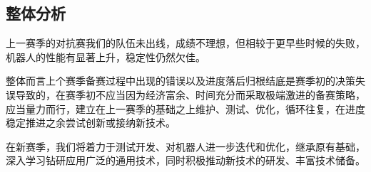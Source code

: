 \subsection{整体分析}

    上一赛季的对抗赛我们的队伍未出线，成绩不理想，但相较于更早些时候的失败，机器人的性能有显著上升，稳定性仍然欠佳。\par
    整体而言上个赛季备赛过程中出现的错误以及进度落后归根结底是赛季初的决策失误导致的，在赛季初不应当因为经济富余、时间充分而采取极端激进的备赛策略，应当量力而行，建立在上一赛季的基础之上维护、测试、优化，循环往复，在进度稳定推进之余尝试创新或接纳新技术。\par
    在新赛季，我们将着力于测试开发、对机器人进一步迭代和优化，继承原有基础，深入学习钻研应用广泛的通用技术，同时积极推动新技术的研发、丰富技术储备。\par